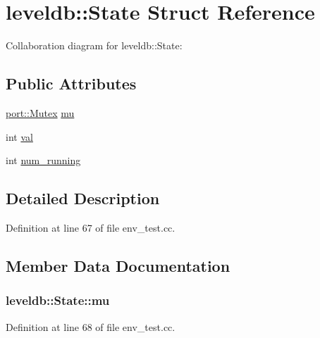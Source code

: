 \hypertarget{structleveldb_1_1_state}{}\section{leveldb\+:\+:State Struct Reference}
\label{structleveldb_1_1_state}


Collaboration diagram for leveldb\+:\+:State\+:
\subsection*{Public Attributes}
\begin{DoxyCompactItemize}
\item 
\hyperlink{classleveldb_1_1port_1_1_mutex}{port\+::\+Mutex} \hyperlink{structleveldb_1_1_state_aa5b0e460a6a87debeb211c47dce8ddd3}{mu}
\item 
int \hyperlink{structleveldb_1_1_state_adfc3479f732e7396e735991e48963981}{val}
\item 
int \hyperlink{structleveldb_1_1_state_a6e84d8550d17c6c3edda2e114a634e61}{num\+\_\+running}
\end{DoxyCompactItemize}


\subsection{Detailed Description}


Definition at line 67 of file env\+\_\+test.\+cc.



\subsection{Member Data Documentation}
\hypertarget{structleveldb_1_1_state_aa5b0e460a6a87debeb211c47dce8ddd3}{}
\subsubsection[{mu}]{ leveldb\+::\+State\+::mu}\label{structleveldb_1_1_state_aa5b0e460a6a87debeb211c47dce8ddd3}


Definition at line 68 of file env\+\_\+test.\+cc.

\hypertarget{structleveldb_1_1_state_a6e84d8550d17c6c3edda2e114a634e61}{}
